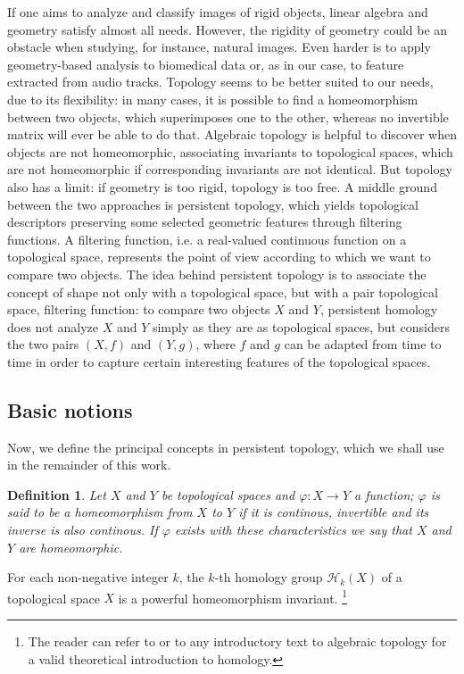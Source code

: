 \documentclass[english, LaM, oneside, noexaminfo]{sapthesis}
\newtheorem{defin}{\bf Definition}[section]
\begin{document}
\noindent If one aims to analyze and classify images of rigid objects, linear algebra and geometry satisfy almost all needs. However, the rigidity of geometry could be an obstacle when studying, for instance, natural  images. Even harder is to apply geometry-based analysis to biomedical data or, as in our case, to feature extracted from audio tracks. Topology seems to be better suited to our needs, due to its flexibility: in many cases, it is possible to find a homeomorphism between two objects, which superimposes one to the other, whereas no invertible matrix will ever be able to do that. Algebraic topology is helpful to discover when objects are not homeomorphic, associating invariants to topological spaces, which are not homeomorphic if corresponding invariants are not identical. But topology also has a limit: if geometry is too rigid, topology is too free. A middle ground between the two approaches is persistent topology, which yields topological descriptors preserving some selected geometric features through filtering functions. A filtering function, i.e. a real-valued continuous function on a topological space, represents the point of view according to which we want to compare two objects. The idea behind persistent topology is to associate the concept of shape not only with a topological space, but with a pair topological space, filtering function: to compare two objects $X$ and $Y$, persistent homology does not analyze $X$ and $Y$ simply as they are as topological spaces, but considers the two pairs $(X, f)$ and $(Y, g)$, where $f$ and $g$ can be adapted from time to time in order to capture certain interesting features of the topological spaces.

\subsection{Basic notions}

Now, we define the principal concepts in persistent topology, which we shall use in the remainder of this work.
\begin{defin} Let $X$ and $Y$ be topological spaces and $\varphi : X {\rightarrow} Y $ a function; $\varphi$ is said to be a \textit{homeomorphism} from $X$ to $Y$ if it is continous, invertible and its inverse is also continous. If $\varphi$ exists with these characteristics we say that $X$ and $Y$ are \textit{homeomorphic}.   \end{defin}

For each non-negative integer $k$, the $k$-th homology group $\mathcal{H}_k(X)$ of a topological space $X$ is a powerful homeomorphism invariant. \footnote{The reader can refer to \cite{rotman2013introduction} or to any introductory text to algebraic topology for a valid theoretical introduction to homology.} 
\end{document}
